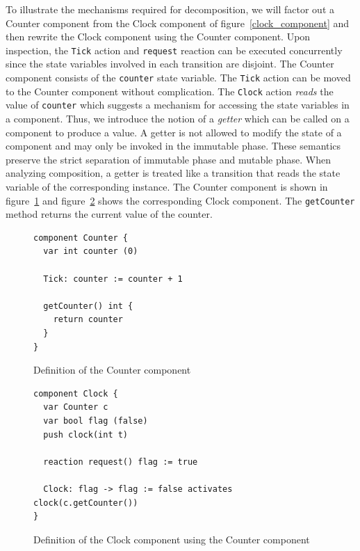 To illustrate the mechanisms required for decomposition, we will factor out a Counter component from the Clock component of figure~\ref{clock_component} and then rewrite the Clock component using the Counter component.
Upon inspection, the \verb+Tick+ action and \verb+request+ reaction can be executed concurrently since the state variables involved in each transition are disjoint.
The Counter component consists of the \verb+counter+ state variable.
The \verb+Tick+ action can be moved to the Counter component without complication.
The \verb+Clock+ action \emph{reads} the value of \verb+counter+ which suggests a mechanism for accessing the state variables in a component.
Thus, we introduce the notion of a \emph{getter} which can be called on a component to produce a value.
A getter is not allowed to modify the state of a component and may only be invoked in the immutable phase.
These semantics preserve the strict separation of immutable phase and mutable phase.
When analyzing composition, a getter is treated like a transition that reads the state variable of the corresponding instance.
The Counter component is shown in figure~\ref{counter_component} and figure~\ref{factored_clock_component} shows the corresponding Clock component.
The \verb+getCounter+ method returns the current value of the counter.

\begin{figure}
\begin{verbatim}
component Counter {
  var int counter (0)

  Tick: counter := counter + 1

  getCounter() int {
    return counter
  }
}
\end{verbatim}
\caption{Definition of the Counter component\label{counter_component}}
\end{figure}

\begin{figure}
\begin{verbatim}
component Clock {
  var Counter c
  var bool flag (false)
  push clock(int t)

  reaction request() flag := true

  Clock: flag -> flag := false activates clock(c.getCounter())
}
\end{verbatim}
\caption{Definition of the Clock component using the Counter component\label{factored_clock_component}}
\end{figure}


